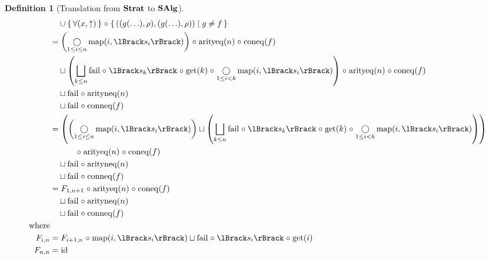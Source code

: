 \documentclass{article}
\newtheorem{definition}[theorem]{Definition}
\begin{document}
\begin{definition}[Translation from $\mathbf{Strat}$ to $\mathbf{SAlg}$]
\begin{align*}
    &\quad \cup \setbuildc{ \forall (x,\fail) } \comp \setbuild{((g(\ldots),\rho),(g(\ldots),\rho))}{ g \neq f } \\
    &= \left( \Comp_{1\leq i \leq n} \map(i,\sem{s_i}) \right) \comp \arityeq(n) \comp \coneq(f) \\
    &\quad \sqcup \left( \bigsqcup_{k \leq n} \lfail \comp \sem{s_k} \comp \get(k) \comp \mathop{\bigcirc}_{1 \leq i < k} \map(i,\sem{s_i}) \right) \comp \arityeq(n) \comp \coneq(f) \\
    &\quad \sqcup \lfail \comp \arityneq(n) \\
    &\quad \sqcup \lfail \comp \conneq(f) \\
    &= \left( \left( \Comp_{1\leq i \leq n} \map(i,\sem{s_i}) \right) \sqcup \left( \bigsqcup_{k \leq n} \lfail \comp \sem{s_k} \comp \get(k) \comp \mathop{\bigcirc}_{1 \leq i < k} \map(i,\sem{s_i}) \right) \right) \\
    &\qquad\quad \comp \arityeq(n) \comp \coneq(f) \\
    &\quad \sqcup \lfail \comp \arityneq(n) \\
    &\quad \sqcup \lfail \comp \conneq(f) \\
    &= F_{1,n+1} \comp \arityeq(n) \comp \coneq(f) \\
    &\quad \sqcup \lfail \comp \arityneq(n) \\
    &\quad \sqcup \lfail \comp \conneq(f) \\
\text{where}& \\
  F_{i,n} &= F_{i+1,n} \comp \map(i,\sem{s_i}) \sqcup \lfail \comp \sem{s_i} \comp \get(i) \\
  F_{n,n} &= \id
\end{align*}


\end{definition}
\end{document}
